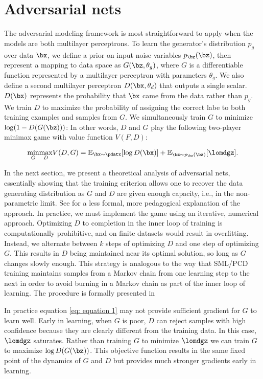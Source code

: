 \section{Adversarial nets}

The adversarial modeling framework is most straightforward to apply when the models are both
multilayer perceptrons. To learn the generator’s distribution $p_g$ over data $\bx$, we define a prior on input noise variables $p_{\bz}(\bz)$, then represent a mapping to data space as $G(\bz, \theta_g)$, where $G$ is a differentiable function represented by a multilayer perceptron with parameters $\theta_g$. We also define a second multilayer perceptron $D(\bx, \theta_d)$ that outputs a single scalar. $D(\bx)$ represents the probability that $\bx$ came from the data rather than $p_g$. We train $D$ to maximize the probability of assigning the correct labe to both training examples and samples from $G$. We simultaneously train $G$ to minimize $\log(1-D(G(\bz)))$:
In other words, $D$ and $G$ play the following two-player minimax game with value function $V(F,D)$:

\begin{equation}
	\underset{G}{\min} \underset{D}{\max} V(D,G) = \mathbb{E}_{\bx\sim \pdatx}[\log D(\bx)]+\mathbb{E}_{\bz\sim p_{\bz}(\bz)}[\lomdgz].\label{eq: equation 1}
\end{equation}

In the next section, we present a theoretical analysis of adversarial nets, essentially showing that the training criterion allows one to recover the data generating distribution as $G$ and $D$ are given enough capacity, i.e., in the non-parametric limit. See %
for a less formal, more pedagogical explanation of the approach. In practice, we must implement the game using an iterative, numerical approach. Optimizing $D$ to completion in the inner loop of training is computationally prohibitive, and on finite datasets would result in overfitting. Instead, we alternate between $k$ steps of optimizing $D$ and one step of optimizing $G$. This results in $D$ being maintained near its optimal solution, so long as $G$ changes slowly enough. This strategy is analogous to the way that SML/PCD \cite{31_younes1999convergence,29_10.1145/1390156.1390290} training maintains samples from a Markov chain from one learning step to the next in order to avoid burning in a Markov chain as part of the inner loop of learning. The procedure is formally presented in %

\noindent In practice equation \ref{eq: equation 1} %
may not provide sufficient gradient for $G$ to learn well. Early in learning, when $G$ is poor, $D$ can reject samples with high confidence because they are clearly different from the training data. In this case, $\lomdgz$ saturates. Rather than training $G$ to minimize $\lomdgz$ we can train $G$ to maximize $\log D(G(\bz))$. This objective function results in the same fixed point of the dynamics of $G$ and $D$ but provides much stronger gradients early in learning.

